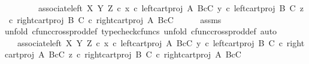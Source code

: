 \begin{isabellebody}
\ \ \ \ \ \ \ \ associate{\isacharunderscore}{\kern0pt}left\ X\ Y\ Z\ {\isasymcirc}\isactrlsub c\ {\isasymlangle}x\ {\isasymcirc}\isactrlsub c\ left{\isacharunderscore}{\kern0pt}cart{\isacharunderscore}{\kern0pt}proj\ A\ {\isacharparenleft}{\kern0pt}B{\isasymtimes}\isactrlsub cC{\isacharparenright}{\kern0pt}{\isacharcomma}{\kern0pt}\ {\isasymlangle}y\ {\isasymcirc}\isactrlsub c\ left{\isacharunderscore}{\kern0pt}cart{\isacharunderscore}{\kern0pt}proj\ B\ C{\isacharcomma}{\kern0pt}\ z\ {\isasymcirc}\isactrlsub c\ right{\isacharunderscore}{\kern0pt}cart{\isacharunderscore}{\kern0pt}proj\ B\ C{\isasymrangle}\ {\isasymcirc}\isactrlsub c\ right{\isacharunderscore}{\kern0pt}cart{\isacharunderscore}{\kern0pt}proj\ A\ {\isacharparenleft}{\kern0pt}B{\isasymtimes}\isactrlsub cC{\isacharparenright}{\kern0pt}{\isasymrangle}{\isachardoublequoteclose}\isanewline
\ \ \ \ \isamarkupfalse%
\ assms\ \isamarkupfalse%
{\isacharparenleft}{\kern0pt}unfold\ cfunc{\isacharunderscore}{\kern0pt}cross{\isacharunderscore}{\kern0pt}prod{\isacharunderscore}{\kern0pt}def{}{\isacharcomma}{\kern0pt}\ typecheck{\isacharunderscore}{\kern0pt}cfuncs{\isacharcomma}{\kern0pt}\ unfold\ cfunc{\isacharunderscore}{\kern0pt}cross{\isacharunderscore}{\kern0pt}prod{\isacharunderscore}{\kern0pt}def{}{\isacharcomma}{\kern0pt}\ auto{\isacharparenright}{\kern0pt}\ \isanewline
\ \ \isamarkupfalse%
\ \isamarkupfalse%
\ {\isachardoublequoteopen}{\isachardot}{\kern0pt}{\isachardot}{\kern0pt}{\isachardot}{\kern0pt}\ {\isacharequal}{\kern0pt}\ associate{\isacharunderscore}{\kern0pt}left\ X\ Y\ Z\ {\isasymcirc}\isactrlsub c\ {\isasymlangle}x\ {\isasymcirc}\isactrlsub c\ left{\isacharunderscore}{\kern0pt}cart{\isacharunderscore}{\kern0pt}proj\ A\ {\isacharparenleft}{\kern0pt}B{\isasymtimes}\isactrlsub cC{\isacharparenright}{\kern0pt}{\isacharcomma}{\kern0pt}\ {\isasymlangle}y\ {\isasymcirc}\isactrlsub c\ left{\isacharunderscore}{\kern0pt}cart{\isacharunderscore}{\kern0pt}proj\ B\ C\ {\isasymcirc}\isactrlsub c\ right{\isacharunderscore}{\kern0pt}cart{\isacharunderscore}{\kern0pt}proj\ A\ {\isacharparenleft}{\kern0pt}B{\isasymtimes}\isactrlsub cC{\isacharparenright}{\kern0pt}{\isacharcomma}{\kern0pt}\ z\ {\isasymcirc}\isactrlsub c\ right{\isacharunderscore}{\kern0pt}cart{\isacharunderscore}{\kern0pt}proj\ B\ C\ {\isasymcirc}\isactrlsub c\ right{\isacharunderscore}{\kern0pt}cart{\isacharunderscore}{\kern0pt}proj\ A\ {\isacharparenleft}{\kern0pt}B{\isasymtimes}\isactrlsub cC{\isacharparenright}{\kern0pt}{\isasymrangle}{\isasymrangle}{\isachardoublequoteclose}\isanewline

\end{isabellebody}
